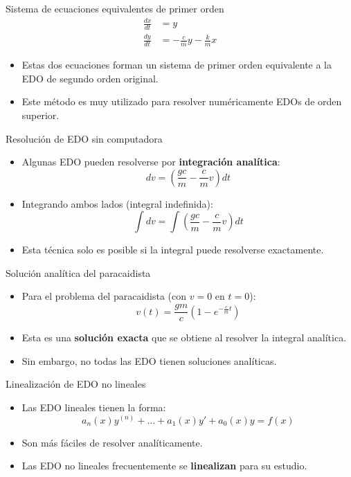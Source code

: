 \documentclass[main.tex]{subfiles}
\begin{document}
\begin{frame}{\small Sistema de ecuaciones equivalentes de primer orden}
\begin{align*}
  \frac{dx}{dt} &= y \\
  \frac{dy}{dt} &= -\frac{c}{m} y - \frac{k}{m} x
\end{align*}
\begin{itemize}
  \item Estas dos ecuaciones forman un sistema de primer orden equivalente a la EDO de segundo orden original.
  \item Este m\'etodo es muy utilizado para resolver num\'ericamente EDOs de orden superior.
\end{itemize}
\end{frame}


\begin{frame}{\small Resoluci\'on de EDO sin computadora}
\begin{itemize}
  \item Algunas EDO pueden resolverse por \textbf{integraci\'on anal\'itica}:
  \[
    dv = \left(\frac{gc}{m} - \frac{c}{m}v\right)dt
  \]
  \item Integrando ambos lados (integral indefinida):
  \[
    \int dv = \int \left(\frac{gc}{m} - \frac{c}{m}v\right) dt
  \]
  \item Esta t\'ecnica solo es posible si la integral puede resolverse exactamente.
\end{itemize}
\end{frame}

\begin{frame}{\small Soluci\'on anal\'itica del paracaidista}
\begin{itemize}
  \item Para el problema del paracaidista (con $v=0$ en $t=0$):
  \[
    v(t) = \frac{gm}{c}(1 - e^{-\frac{c}{m}t})
  \]
  \item Esta es una \textbf{soluci\'on exacta} que se obtiene al resolver la integral anal\'itica.
  \item Sin embargo, no todas las EDO tienen soluciones anal\'iticas.
\end{itemize}
\end{frame}

\begin{frame}{\small Linealizaci\'on de EDO no lineales}
\begin{itemize}
  \item Las EDO lineales tienen la forma:
  \[
    a_n(x) y^{(n)} + \dots + a_1(x) y' + a_0(x) y = f(x)
  \]
  \item Son m\'as f\'aciles de resolver anal\'iticamente.
  \item Las EDO no lineales frecuentemente se \textbf{linealizan} para su estudio.
\end{itemize}
\end{frame}
\end{document}
